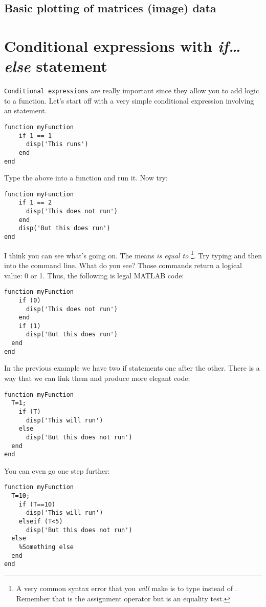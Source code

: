 \documentclass{article}
\begin{document}
\subsection*{Basic plotting of matrices (image) data}



\section{Conditional expressions with \emph{if\dots else} statement}

\verb|Conditional expressions| are really important since they allow you to add logic to a function.
Let's start off with a very simple conditional expression involving an  statement.

\begin{lstlisting}
function myFunction
	if 1 == 1
	  disp('This runs')
	end
end
\end{lstlisting}

Type the above into a function and run it. Now try:
\begin{lstlisting}
function myFunction
	if 1 == 2
	  disp('This does not run')
	end
	disp('But this does run')
end
\end{lstlisting}

I think you can see what's going on.
The \mcode{==} means \emph{is equal to}%
\footnote{%
  A very common syntax error that you \textit{will} make is to type  instead of .
  Remember that \mcode{=} is the assignment operator but \mcode{==} is an equality test.
}.
Try typing  and then  into the command line. What do you see?
Those commands return a logical value: 0 or 1.
Thus, the following is legal MATLAB code:
\begin{lstlisting}
function myFunction
	if (0)
	  disp('This does not run')
	end
	if (1)
	  disp('But this does run')
  end
end
\end{lstlisting}

In the previous example we have two if statements one after the other.
There is a way that we can link them and produce more elegant code:
\begin{lstlisting}
function myFunction
  T=1;
	if (T)
	  disp('This will run')
	else
	  disp('But this does not run')
  end
end
\end{lstlisting}

You can even go one step further:
\begin{lstlisting}
function myFunction
  T=10;
	if (T==10)
	  disp('This will run')
	elseif (T<5)
	  disp('But this does not run')
  else
    %Something else
  end
end
\end{lstlisting}
\end{document}
